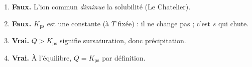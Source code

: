 \documentclass[11pt,a4paper]{article}
\begin{document}
\begin{corrige}
\begin{enumerate}[label=\alph*)]
  \item \textbf{Faux.} L'ion commun \emph{diminue} la solubilité (Le Chatelier).
  \item \textbf{Faux.} $K_{\mathrm{ps}}$ est une constante (à $T$ fixée) : il ne change pas ; c'est $s$
        qui chute.
  \item \textbf{Vrai.} $Q>K_{\mathrm{ps}}$ signifie sursaturation, donc précipitation.
  \item \textbf{Vrai.} À l'équilibre, $Q=K_{\mathrm{ps}}$ par définition.
\end{enumerate}
\end{corrige}
\end{document}
